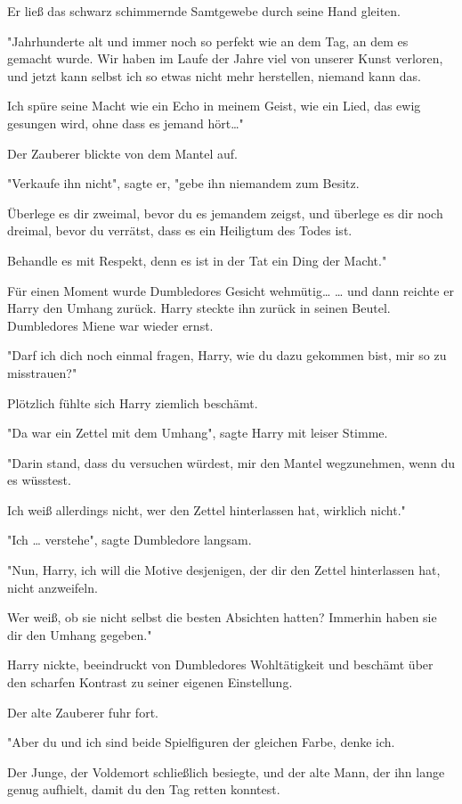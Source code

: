 {Er ließ das schwarz schimmernde Samtgewebe durch seine Hand gleiten.

"Jahrhunderte alt und immer noch so perfekt wie an dem Tag, an dem es gemacht wurde. Wir haben im Laufe der Jahre viel von unserer Kunst verloren, und jetzt kann selbst ich so etwas nicht mehr herstellen, niemand kann das.

Ich spüre seine Macht wie ein Echo in meinem Geist, wie ein Lied, das ewig gesungen wird, ohne dass es jemand hört…"

Der Zauberer blickte von dem Mantel auf.

"Verkaufe ihn nicht", sagte er, "gebe ihn niemandem zum Besitz.

Überlege es dir zweimal, bevor du es jemandem zeigst, und überlege es dir noch dreimal, bevor du verrätst, dass es ein Heiligtum des Todes ist.

Behandle es mit Respekt, denn es ist in der Tat ein Ding der Macht."

Für einen Moment wurde Dumbledores Gesicht wehmütig… … und dann reichte er Harry den Umhang zurück. Harry steckte ihn zurück in seinen Beutel. Dumbledores Miene war wieder ernst.

"Darf ich dich noch einmal fragen, Harry, wie du dazu gekommen bist, mir so zu misstrauen?"

Plötzlich fühlte sich Harry ziemlich beschämt.

"Da war ein Zettel mit dem Umhang", sagte Harry mit leiser Stimme.

"Darin stand, dass du versuchen würdest, mir den Mantel wegzunehmen, wenn du es wüsstest.

Ich weiß allerdings nicht, wer den Zettel hinterlassen hat, wirklich nicht."

"Ich … verstehe", sagte Dumbledore langsam.

"Nun, Harry, ich will die Motive desjenigen, der dir den Zettel hinterlassen hat, nicht anzweifeln.

Wer weiß, ob sie nicht selbst die besten Absichten hatten? Immerhin haben sie dir den Umhang gegeben."

Harry nickte, beeindruckt von Dumbledores Wohltätigkeit und beschämt über den scharfen Kontrast zu seiner eigenen Einstellung.

Der alte Zauberer fuhr fort.

"Aber du und ich sind beide Spielfiguren der gleichen Farbe, denke ich.

Der Junge, der Voldemort schließlich besiegte, und der alte Mann, der ihn lange genug aufhielt, damit du den Tag retten konntest.

}
